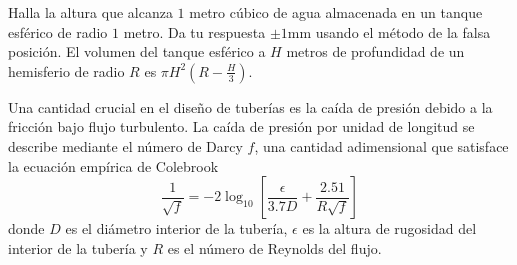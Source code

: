 \begin{questions}

    \question

    Halla la altura que alcanza $1$ metro cúbico de agua almacenada
    en un tanque esférico de radio $1$ metro.
    Da tu respuesta $\pm1$mm usando el método de la falsa posición.
    El volumen del tanque esférico a $H$ metros de profundidad de un
    hemisferio de radio $R$ es $\pi H^{2}\left(R-\frac{H}{3}\right)$.



    \question

    Una cantidad crucial en el diseño de tuberías es la caída de
    presión debido a la fricción bajo flujo turbulento.
    La caída de presión por unidad de longitud se describe mediante
    el número de Darcy $f$, una cantidad adimensional que satisface
    la ecuación empírica de Colebrook
    \begin{equation*}
        \frac{1}{\sqrt{f}}=
        -2\log_{10}\left[\frac{\epsilon}{3.7D}+
            \frac{2.51}{R\sqrt{f}}\right]
    \end{equation*}
    donde $D$ es el diámetro interior de la tubería, $\epsilon$ es la
    altura de rugosidad del interior de la tubería y $R$ es el número
    de Reynolds del flujo.



\end{questions}
